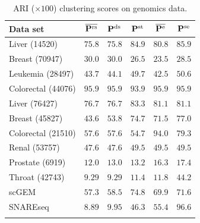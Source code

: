 
\begin{table}\centering
    \caption{ARI ($\times 100$) clustering scores on genomics data.}
    \begin{small}
    \begin{sc}
    \begin{tabular}{lc@{\hskip 0.1in}c@{\hskip 0.1in}c@{\hskip 0.1in}c@{\hskip 0.1in}c}
    \toprule[1.5pt]
    Data set & $\overline{\mathbf{P}^{\mathrm{rs}}}$ & $\mathbf{P}^{\mathrm{ds}}$ & $\mathbf{P}^{\mathrm{st}}$ & $\overline{\mathbf{P}^{\mathrm{e}}}$ & $\mathbf{P}^{\mathrm{se}}$ \\
    \midrule
    Liver \tiny{(14520)} & $75.8$ & $75.8$ & $84.9$ & $80.8$ & $\mathbf{85.9}$ \\
    Breast \tiny{(70947)} & $\mathbf{30.0}$ & $\mathbf{30.0}$ & $26.5$ & $23.5$ & $28.5$ \\
    Leukemia \tiny{(28497)} & $43.7$ & $44.1$ & $49.7$ & $42.5$ & $\mathbf{50.6}$ \\
    Colorectal \tiny{(44076)} & $\mathbf{95.9}$ & $\mathbf{95.9}$ & $93.9$ & $\mathbf{95.9}$ & $\mathbf{95.9}$ \\
    Liver \tiny{(76427)} & $76.7$ & $76.7$ & $\mathbf{83.3}$ & $81.1$ & $81.1$ \\
    Breast \tiny{(45827)} & $43.6$ & $53.8$ & $74.7$ & $71.5$ & $\mathbf{77.0}$ \\
    Colorectal \tiny{(21510)} & $57.6$ & $57.6$ & $54.7$ & $\mathbf{94.0}$ & $79.3$ \\
    Renal \tiny{(53757)} & $47.6$ & $47.6$ & $\mathbf{49.5}$ & $\mathbf{49.5}$ & $\mathbf{49.5}$ \\
    Prostate \tiny{(6919)} & $12.0$ & $13.0$ & $13.2$ & $16.3$ & $\mathbf{17.4}$ \\
    Throat \tiny{(42743)} & $9.29$ & $9.29$ & $11.4$ & $11.8$ & $\mathbf{44.2}$ \\
    \midrule[0.2pt]
    scGEM & $57.3$ & $58.5$ & $\mathbf{74.8}$ & $69.9$ & $71.6$ \\
    SNAREseq & $8.89$ & $9.95$ & $46.3$ & $55.4$ & $\mathbf{96.6}$ \\
    \bottomrule[1.5pt]
    \label{table_spectral_microaray}
    \end{tabular}
    \end{sc}
\end{small}
\end{table}

